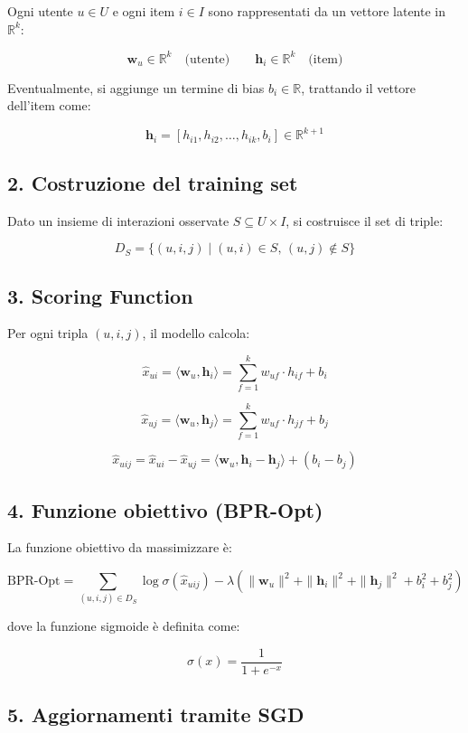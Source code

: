 \documentclass{article}
\begin{document}
Ogni utente \( u \in U \) e ogni item \( i \in I \) sono rappresentati da un vettore latente in \( \mathbb{R}^k \):

\[
\mathbf{w}_u \in \mathbb{R}^k \quad \text{(utente)} \qquad
\mathbf{h}_i \in \mathbb{R}^k \quad \text{(item)}
\]

Eventualmente, si aggiunge un termine di bias \( b_i \in \mathbb{R} \), trattando il vettore dell'item come:

\[
\mathbf{h}_i = [h_{i1}, h_{i2}, \dots, h_{ik}, b_i] \in \mathbb{R}^{k+1}
\]

\subsection*{2. Costruzione del training set}

Dato un insieme di interazioni osservate \( S \subseteq U \times I \), si costruisce il set di triple:

\[
D_S = \{(u, i, j) \mid (u, i) \in S,\, (u, j) \notin S \}
\]

\subsection*{3. Scoring Function}

Per ogni tripla \( (u, i, j) \), il modello calcola:

\[
\hat{x}_{ui} = \langle \mathbf{w}_u, \mathbf{h}_i \rangle = \sum_{f=1}^{k} w_{uf} \cdot h_{if} + b_i
\]

\[
\hat{x}_{uj} = \langle \mathbf{w}_u, \mathbf{h}_j \rangle = \sum_{f=1}^{k} w_{uf} \cdot h_{jf} + b_j
\]

\[
\hat{x}_{uij} = \hat{x}_{ui} - \hat{x}_{uj} = \langle \mathbf{w}_u, \mathbf{h}_i - \mathbf{h}_j \rangle + (b_i - b_j)
\]

\subsection*{4. Funzione obiettivo (BPR-Opt)}

La funzione obiettivo da massimizzare è:

\[
\text{BPR-Opt} = \sum_{(u,i,j) \in D_S} \log \sigma(\hat{x}_{uij}) 
- \lambda \left( \|\mathbf{w}_u\|^2 + \|\mathbf{h}_i\|^2 + \|\mathbf{h}_j\|^2 + b_i^2 + b_j^2 \right)
\]

dove la funzione sigmoide è definita come:

\[
\sigma(x) = \frac{1}{1 + e^{-x}}
\]

\subsection*{5. Aggiornamenti tramite SGD}
\end{document}
